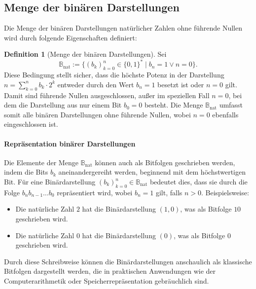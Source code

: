 \documentclass{book}
\theoremstyle{plain}
\theoremstyle{remark}
\theoremstyle{definition}
\newtheorem{definition}{Definition}[section]
\begin{document}
\subsection{Menge der binären Darstellungen}

Die Menge der binären Darstellungen natürlicher Zahlen ohne führende Nullen wird durch folgende Eigenschaften definiert:

\begin{definition}[Menge der binären Darstellungen]
    Sei 
    \[
    \mathbb{B}_{\text{nat}} := \{(b_k)_{k=0}^n \in \{0,1\}^* \mid b_n = 1 \lor n = 0\}.
    \]
    Diese Bedingung stellt sicher, dass die höchste Potenz in der Darstellung \( n = \sum_{k=0}^n b_k \cdot 2^k \) entweder durch den Wert \( b_n = 1 \) besetzt ist oder \( n = 0 \) gilt. Damit sind führende Nullen ausgeschlossen, außer im speziellen Fall \( n = 0 \), bei dem die Darstellung aus nur einem Bit \( b_0 = 0 \) besteht. Die Menge \( \mathbb{B}_{\text{nat}} \) umfasst somit alle binären Darstellungen ohne führende Nullen, wobei \( n = 0 \) ebenfalls eingeschlossen ist.

\end{definition}

\paragraph{Repräsentation binärer Darstellungen}

Die Elemente der Menge \( \mathbb{B}_{\text{nat}} \) können auch als Bitfolgen geschrieben werden, indem die Bits \( b_k \) aneinandergereiht werden, beginnend mit dem höchstwertigen Bit. Für eine Binärdarstellung \( (b_k)_{k=0}^n \in \mathbb{B}_{\text{nat}} \) bedeutet dies, dass sie durch die Folge \( b_n b_{n-1} \ldots b_0 \) repräsentiert wird, wobei \( b_n = 1 \) gilt, falls \( n > 0 \). Beispielsweise:

\begin{itemize}
    \item Die natürliche Zahl \( 2 \) hat die Binärdarstellung \( (1, 0) \), was als Bitfolge \( 10 \) geschrieben wird.
    \item Die natürliche Zahl \( 0 \) hat die Binärdarstellung \( (0) \), was als Bitfolge \( 0 \) geschrieben wird.
\end{itemize}

Durch diese Schreibweise können die Binärdarstellungen anschaulich als klassische Bitfolgen dargestellt werden, die in praktischen Anwendungen wie der Computerarithmetik oder Speicherrepräsentation gebräuchlich sind.
\end{document}
